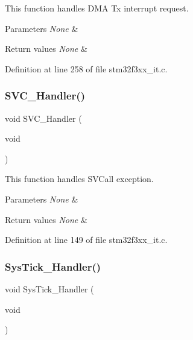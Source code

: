 This function handles D\+MA Tx interrupt request. 


\begin{DoxyParams}{Parameters}
{\em None} & \\
\hline
\end{DoxyParams}

\begin{DoxyRetVals}{Return values}
{\em None} & \\
\hline
\end{DoxyRetVals}


Definition at line 258 of file stm32f3xx\+\_\+it.\+c.

\mbox{\label{group___c_a_n___networking_ga3e5ddb3df0d62f2dc357e64a3f04a6ce}} 
\subsubsection{S\+V\+C\+\_\+\+Handler()}
{\footnotesize\ttfamily void S\+V\+C\+\_\+\+Handler (\begin{DoxyParamCaption}\item[{void}]{ }\end{DoxyParamCaption})}



This function handles S\+V\+Call exception. 


\begin{DoxyParams}{Parameters}
{\em None} & \\
\hline
\end{DoxyParams}

\begin{DoxyRetVals}{Return values}
{\em None} & \\
\hline
\end{DoxyRetVals}


Definition at line 149 of file stm32f3xx\+\_\+it.\+c.

\mbox{\label{group___c_a_n___networking_gab5e09814056d617c521549e542639b7e}} 
\subsubsection{Sys\+Tick\+\_\+\+Handler()}
{\footnotesize\ttfamily void Sys\+Tick\+\_\+\+Handler (\begin{DoxyParamCaption}\item[{void}]{ }\end{DoxyParamCaption})}



